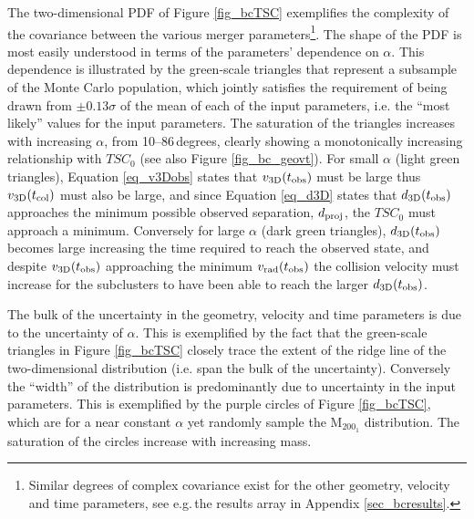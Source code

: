 The two-dimensional PDF of Figure \ref{fig_bcTSC} exemplifies the complexity of the covariance between the various merger parameters\footnote{Similar degrees of complex covariance exist for the other geometry, velocity and time parameters, see e.g.\,the results array in Appendix \ref{sec_bcresults}.}.
The shape of the PDF is most easily understood in terms of the parameters' dependence on $\alpha$.
This dependence is illustrated by the green-scale triangles that represent a subsample of the Monte Carlo population,  which jointly satisfies the requirement of being drawn from $\pm 0.13 \sigma$ of the mean of each of the input parameters, i.e. the ``most likely'' values for the input parameters.
The saturation of the triangles increases with increasing $\alpha$, from 10--86\,degrees, clearly showing a monotonically increasing relationship with $TSC_0$ (see also Figure \ref{fig_bc_geovt}).
For small $\alpha$ (light green triangles), Equation \ref{eq_v3Dobs} states that $v_{\rm 3D}(t_{\rm obs})$ must be large thus $v_{\rm 3D}(t_{\rm col})$ must also be large, and since Equation \ref{eq_d3D} states that $d_{\rm 3D}(t_{\rm obs})$ approaches the minimum possible observed separation, $d_{\rm proj}$, the $TSC_0$ must approach a minimum.
Conversely for large $\alpha$ (dark green triangles), $d_{\rm 3D}(t_{\rm obs})$ becomes large increasing the time required to reach the observed state, and despite $v_{\rm 3D}(t_{\rm obs})$ approaching the minimum $v_{\rm rad}(t_{\rm obs})$ the collision velocity must increase for the subclusters to have been able to reach the larger $d_{\rm 3D}(t_{\rm obs})$.   

The bulk of the uncertainty in the geometry, velocity and time parameters is due to the uncertainty of $\alpha$.
This is exemplified by the fact that the green-scale triangles in Figure \ref{fig_bcTSC} closely trace the extent of the ridge line of the two-dimensional distribution (i.e. span the bulk of the uncertainty).
Conversely the ``width'' of the distribution is predominantly due to uncertainty in the input parameters.
This is exemplified by the purple circles of Figure \ref{fig_bcTSC}, which are for a near constant $\alpha$ yet randomly sample the M$_{200_1}$ distribution. 
The saturation of the circles increase with increasing mass.

